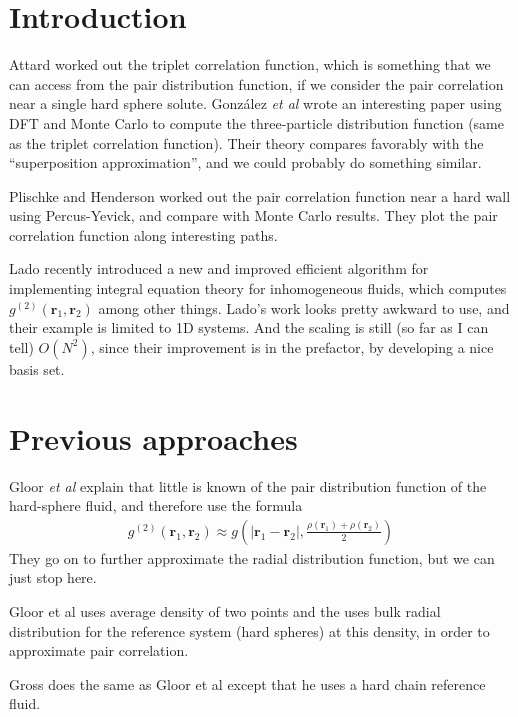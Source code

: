 \documentclass[letterpaper,twocolumn,amsmath,amssymb,pre]{revtex4-1}
\newcommand{\rr}{\textbf{r}}
\begin{document}
\section{Introduction}

Attard worked out the triplet correlation function, which is something
that we can access from the pair distribution function, if we consider
the pair correlation near a single hard sphere
solute\cite{attard1989spherically}.  Gonz\'alez \emph{et al} wrote an
interesting paper using DFT and Monte Carlo to compute the
three-particle distribution function (same as the triplet correlation
function)\cite{gonzalez1999test}.  Their theory compares favorably
with the ``superposition approximation'', and we could probably do
something similar.

Plischke and Henderson worked out the pair correlation function near a
hard wall using Percus-Yevick, and compare with Monte Carlo
results\cite{plischke1986pair}.  They plot the pair correlation
function along interesting paths.

Lado recently introduced a new and improved efficient algorithm for
implementing integral equation theory for inhomogeneous fluids, which
computes $g^{(2)}(\rr_1,\rr_2)$ among other
things\cite{lado2009efficient}.  Lado's work looks pretty awkward to
use, and their example is limited to 1D systems.  And the scaling is
still (so far as I can tell) $O(N^2)$, since their improvement is in
the prefactor, by developing a nice basis set.

\section{Previous approaches}

Gloor \emph{et al} explain that little is known of the pair
distribution function of the hard-sphere fluid, and therefore use the
formula
\begin{align}
  g^{(2)}(\rr_1,\rr_2) \approx g\left(|\rr_1-\rr_2|, \frac{\rho(\rr_1)+\rho(\rr_2)}2\right)
\end{align}
They go on to further approximate the radial distribution function,
but we can just stop here.

Gloor et al \cite{gloor2007prediction} uses average density of two points and the uses
bulk radial distribution for the reference system (hard spheres) at
this density, in order to approximate pair correlation.

Gross \cite{gross2009density} does the same as Gloor et al except that
he uses a hard chain reference fluid.
\end{document}

